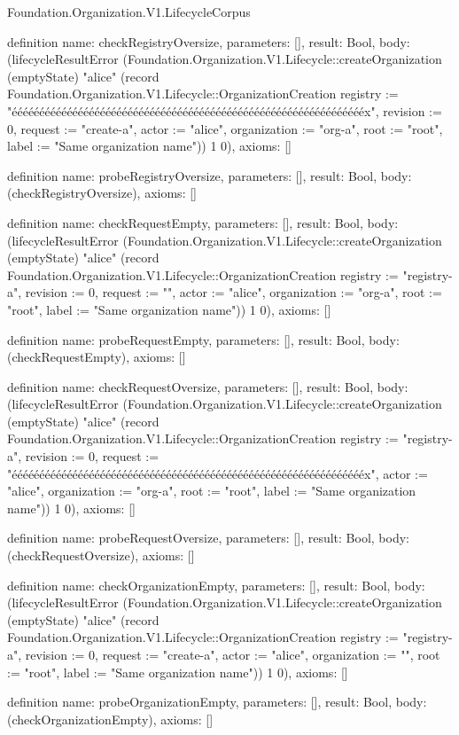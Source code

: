 \begin{lexlean}{Foundation.Organization.V1.LifecycleCorpus}
\begin{semanticmodule}
definition{
  name: checkRegistryOversize,
  parameters: [],
  result: Bool,
  body: (lifecycleResultError (Foundation.Organization.V1.Lifecycle::createOrganization (emptyState) "alice" (record Foundation.Organization.V1.Lifecycle::OrganizationCreation {registry := "ééééééééééééééééééééééééééééééééééééééééééééééééééééééééééééééééx", revision := 0, request := "create-a", actor := "alice", organization := "org-a", root := "root", label := "Same organization name"})) 1 0),
  axioms: []
}

definition{
  name: probeRegistryOversize,
  parameters: [],
  result: Bool,
  body: (checkRegistryOversize),
  axioms: []
}

definition{
  name: checkRequestEmpty,
  parameters: [],
  result: Bool,
  body: (lifecycleResultError (Foundation.Organization.V1.Lifecycle::createOrganization (emptyState) "alice" (record Foundation.Organization.V1.Lifecycle::OrganizationCreation {registry := "registry-a", revision := 0, request := "", actor := "alice", organization := "org-a", root := "root", label := "Same organization name"})) 1 0),
  axioms: []
}

definition{
  name: probeRequestEmpty,
  parameters: [],
  result: Bool,
  body: (checkRequestEmpty),
  axioms: []
}

definition{
  name: checkRequestOversize,
  parameters: [],
  result: Bool,
  body: (lifecycleResultError (Foundation.Organization.V1.Lifecycle::createOrganization (emptyState) "alice" (record Foundation.Organization.V1.Lifecycle::OrganizationCreation {registry := "registry-a", revision := 0, request := "ééééééééééééééééééééééééééééééééééééééééééééééééééééééééééééééééx", actor := "alice", organization := "org-a", root := "root", label := "Same organization name"})) 1 0),
  axioms: []
}

definition{
  name: probeRequestOversize,
  parameters: [],
  result: Bool,
  body: (checkRequestOversize),
  axioms: []
}

definition{
  name: checkOrganizationEmpty,
  parameters: [],
  result: Bool,
  body: (lifecycleResultError (Foundation.Organization.V1.Lifecycle::createOrganization (emptyState) "alice" (record Foundation.Organization.V1.Lifecycle::OrganizationCreation {registry := "registry-a", revision := 0, request := "create-a", actor := "alice", organization := "", root := "root", label := "Same organization name"})) 1 0),
  axioms: []
}

definition{
  name: probeOrganizationEmpty,
  parameters: [],
  result: Bool,
  body: (checkOrganizationEmpty),
  axioms: []
}


\end{semanticmodule}
\end{lexlean}
